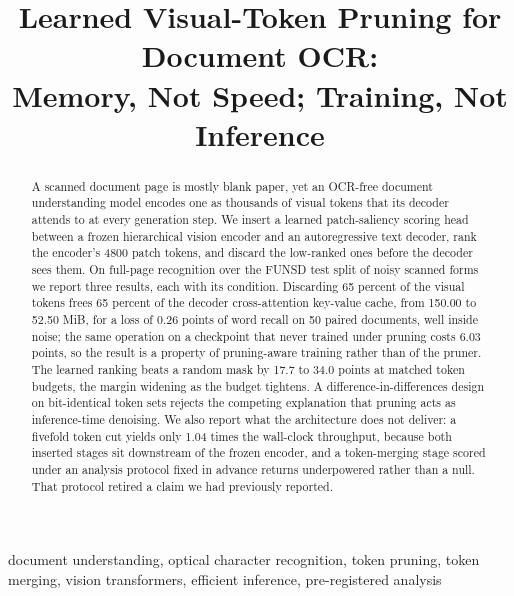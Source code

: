 \documentclass[conference]{IEEEtran}
\begin{document}
\title{Learned Visual-Token Pruning for Document OCR:\\
Memory, Not Speed; Training, Not Inference}

\author{
}

\maketitle

\begin{abstract}
A scanned document page is mostly blank paper, yet an OCR-free document understanding model
encodes one as thousands of visual tokens that its decoder attends to at every generation
step. We insert a learned patch-saliency scoring head between a frozen hierarchical vision
encoder and an autoregressive text decoder, rank the encoder's 4800 patch tokens, and
discard the low-ranked ones before the decoder sees them. On full-page recognition over the
FUNSD test split of noisy scanned forms we report three results, each with its condition.
Discarding 65 percent of the visual tokens frees 65 percent of the decoder cross-attention
key-value cache, from 150.00 to 52.50 MiB, for a loss of 0.26 points of word recall on 50
paired documents, well inside noise; the same operation on a checkpoint that never trained
under pruning costs 6.03 points, so the result is a property of pruning-aware training
rather than of the pruner. The learned ranking beats a random mask by 17.7 to 34.0 points at
matched token budgets, the margin widening as the budget tightens. A difference-in-differences
design on bit-identical token sets rejects the competing explanation that pruning acts as
inference-time denoising. We also report what the architecture does not deliver: a fivefold
token cut yields only 1.04 times the wall-clock throughput, because both inserted stages sit
downstream of the frozen encoder, and a token-merging stage scored under an analysis protocol
fixed in advance returns underpowered rather than a null. That protocol retired a claim we
had previously reported.
\end{abstract}

\begin{IEEEkeywords}
document understanding, optical character recognition, token pruning, token merging, vision
transformers, efficient inference, pre-registered analysis
\end{IEEEkeywords}
\end{document}
